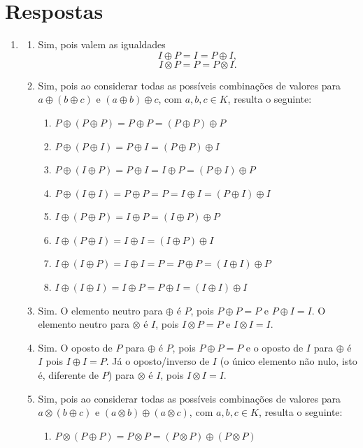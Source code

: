 \documentclass[12pt,a4paper]{article}
\begin{document}
\newpage
\section*{Respostas}
\begin{enumerate}
\item
\begin{enumerate}
\item Sim, pois valem as igualdades
\[ I \oplus P = I = P \oplus I,\]
\[I \otimes P = P = P \otimes I.\]

\item Sim, pois ao considerar todas as possíveis combinações de valores para $a \oplus (b \oplus c)$ e $(a \oplus b) \oplus c$, com $a,b,c \in K$, resulta o seguinte:
\begin{enumerate}
\item $P \oplus (P \oplus P) = P \oplus P = (P \oplus P) \oplus P$
\item $P \oplus (P \oplus I) = P \oplus I = (P \oplus P) \oplus I$
\item $P \oplus (I \oplus P) = P \oplus I = I \oplus P = (P \oplus I) \oplus P$
\item $P \oplus (I \oplus I) = P \oplus P = P = I \oplus I = (P \oplus I) \oplus I$
\item $I \oplus (P \oplus P) = I \oplus P = (I \oplus P) \oplus P$
\item $I \oplus (P \oplus I) = I \oplus I = (I \oplus P) \oplus I$
\item $I \oplus (I \oplus P) = I \oplus I = P = P \oplus P = (I \oplus I) \oplus P$
\item $I \oplus (I \oplus I) = I \oplus P = P \oplus I = (I \oplus I) \oplus I$
\end{enumerate}
\item Sim. O elemento neutro para $\oplus$ é $P$, pois $P\oplus P = P$ e $P\oplus I = I$. O elemento neutro para $\otimes$ é $I$, pois $I\otimes P = P$ e $I\otimes I = I$.
\item Sim. O oposto de $P$ para $\oplus$ é $P$, pois $P\oplus P = P$ e o oposto de $I$ para $\oplus$ é $I$ pois $I\oplus I = P$. Já o oposto/inverso de $I$ (o único elemento não nulo, isto é, diferente de $P$) para $\otimes$ é $I$, pois $I\otimes I = I$.
\item Sim, pois ao considerar todas as possíveis combinações de valores para $a \otimes (b \oplus c)$ e $(a \otimes b) \oplus (a \otimes c)$, com $a,b,c \in K$, resulta o seguinte:
\begin{enumerate}
\item $P \otimes (P \oplus P) = P \otimes P = (P \otimes P) \oplus (P \otimes P)$

\end{enumerate}
\end{enumerate}
\end{enumerate}
\end{document}
